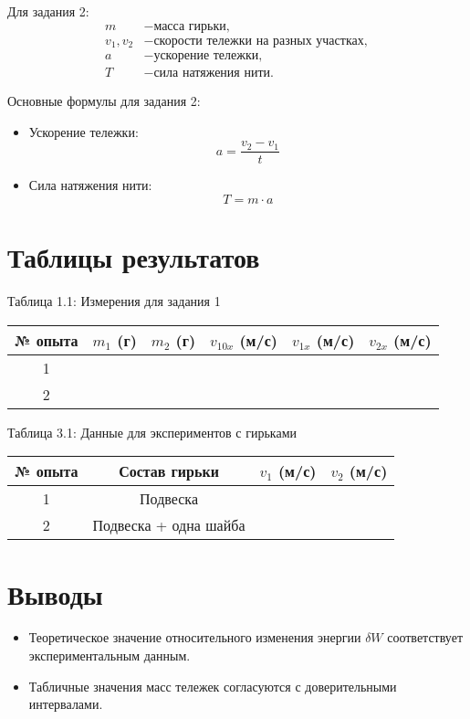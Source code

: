 \documentclass{article}
\begin{document}
Для задания 2:
\begin{align*}
    m &- \text{масса гирьки}, \\
    v_1, v_2 &- \text{скорости тележки на разных участках}, \\
    a &- \text{ускорение тележки}, \\
    T &- \text{сила натяжения нити}.
\end{align*}

Основные формулы для задания 2:
\begin{itemize}
    \item Ускорение тележки:
    \[
    a = \frac{v_2 - v_1}{t}
    \]
    \item Сила натяжения нити:
    \[
    T = m \cdot a
    \]
\end{itemize}

\section*{Таблицы результатов}
Таблица 1.1: Измерения для задания 1
\begin{tabular}{|c|c|c|c|c|c|}
    \hline
    № опыта & $m_1$ (г) & $m_2$ (г) & $v_{10x}$ (м/с) & $v_{1x}$ (м/с) & $v_{2x}$ (м/с) \\
    \hline
    1 &  &  &  &  &  \\
    2 &  &  &  &  &  \\
    \hline
\end{tabular}

Таблица 3.1: Данные для экспериментов с гирьками
\begin{tabular}{|c|c|c|c|}
    \hline
    № опыта & Состав гирьки & $v_1$ (м/с) & $v_2$ (м/с) \\
    \hline
    1 & Подвеска &  &  \\
    2 & Подвеска + одна шайба &  &  \\
    \hline
\end{tabular}

\section*{Выводы}
\begin{itemize}
    \item Теоретическое значение относительного изменения энергии $\delta W$ соответствует экспериментальным данным.
    \item Табличные значения масс тележек согласуются с доверительными интервалами.
\end{itemize}
\end{document}

